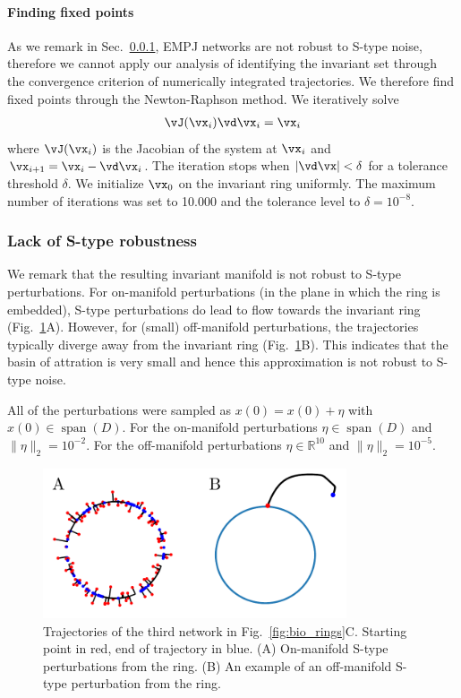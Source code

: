 \documentclass{article} %
\newcounter{ct}
\newcommand{\reals}{\mathbb{R}}
\theoremstyle{definition}
\theoremstyle{remark}
\begin{document}
\paragraph{Finding fixed points}
As we remark in Sec.~\ref{sec:empjnonrobust}, EMPJ networks are not robust to S-type noise, therefore we cannot apply our analysis of identifying the invariant set through the convergence criterion of numerically integrated trajectories.
We therefore find fixed points through the Newton-Raphson method.
We iteratively solve
\begin{align}
 \vJ(\vx_i)\vd\vx_i = \vx_i
\end{align}
where \(\vJ(\vx_i)\) is the Jacobian of the system at \(\vx_i\) and \(\vx_{i+1}=\vx_i-\vd\vx_i\).
The iteration stops when $|\vd\vx|<\delta$ for a tolerance threshold $\delta$.
We initialize \(\vx_0\) on the invariant ring uniformly.
The maximum number of iterations was set to 10.000 and the tolerance level to $\delta=10^{-8}$.

\subsubsection{Lack of S-type robustness}\label{sec:empjnonrobust}
We remark that the resulting invariant manifold is not robust to S-type perturbations.
For on-manifold perturbations (in the plane in which the ring is embedded), S-type perturbations do lead to flow towards the invariant ring (Fig.~\ref{fig:empj_onoff_perturbation}A).
However, for (small) off-manifold perturbations, the trajectories typically diverge away from the invariant ring (Fig.~\ref{fig:empj_onoff_perturbation}B).
This indicates that the basin of attration is very small and hence this approximation is not robust to S-type noise.


All of the perturbations were sampled as
\(x(0) = x(0) + \eta\) with \(x(0)\in \operatorname{span}(D)\).
For the on-manifold perturbations \(\eta\in \operatorname{span}(D)\)  and \(\|\eta\|_2=10^{-2}\).
For the off-manifold perturbations \(\eta\in \reals^{10}\) and \(\|\eta\|_2=10^{-5}\).


\begin{figure}[h]
\centering
\includegraphics[width=0.8\textwidth]{empj_onoff_perturbation}
\caption{Trajectories of the third network in Fig.~\ref{fig:bio_rings}C. Starting point in red, end of trajectory in blue.
(A) On-manifold S-type perturbations from the ring.
(B) An example of an off-manifold  S-type perturbation from the ring.
}\label{fig:empj_onoff_perturbation}
\end{figure}
\end{document}
